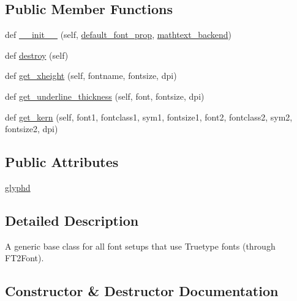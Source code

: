 \subsection*{Public Member Functions}
\begin{DoxyCompactItemize}
\item 
def \hyperlink{classmatplotlib_1_1__mathtext_1_1TruetypeFonts_aca0dca97fdfcfbf6908ac85c1f182ccc}{\+\_\+\+\_\+init\+\_\+\+\_\+} (self, \hyperlink{classmatplotlib_1_1__mathtext_1_1Fonts_a716114e691f32387590085aa0f7128ce}{default\+\_\+font\+\_\+prop}, \hyperlink{classmatplotlib_1_1__mathtext_1_1Fonts_a9742f1a6a11c8cf2ba8b0daddab0acec}{mathtext\+\_\+backend})
\item 
def \hyperlink{classmatplotlib_1_1__mathtext_1_1TruetypeFonts_a4d890594a0efb99c90b1f9b037fed88f}{destroy} (self)
\item 
def \hyperlink{classmatplotlib_1_1__mathtext_1_1TruetypeFonts_a0403e6f209e163ef279321c6f7ea2ba8}{get\+\_\+xheight} (self, fontname, fontsize, dpi)
\item 
def \hyperlink{classmatplotlib_1_1__mathtext_1_1TruetypeFonts_a30cda17f23d94e053621131b208006a6}{get\+\_\+underline\+\_\+thickness} (self, font, fontsize, dpi)
\item 
def \hyperlink{classmatplotlib_1_1__mathtext_1_1TruetypeFonts_acfca9ec2bb91a619948e4f64cdd852bd}{get\+\_\+kern} (self, font1, fontclass1, sym1, fontsize1, font2, fontclass2, sym2, fontsize2, dpi)
\end{DoxyCompactItemize}
\subsection*{Public Attributes}
\begin{DoxyCompactItemize}
\item 
\hyperlink{classmatplotlib_1_1__mathtext_1_1TruetypeFonts_afab1016d3c4199a67c43cdb921744baf}{glyphd}
\end{DoxyCompactItemize}


\subsection{Detailed Description}
\begin{DoxyVerb}A generic base class for all font setups that use Truetype fonts
(through FT2Font).
\end{DoxyVerb}
 

\subsection{Constructor \& Destructor Documentation}
\mbox{\label{classmatplotlib_1_1__mathtext_1_1TruetypeFonts_aca0dca97fdfcfbf6908ac85c1f182ccc}} 
